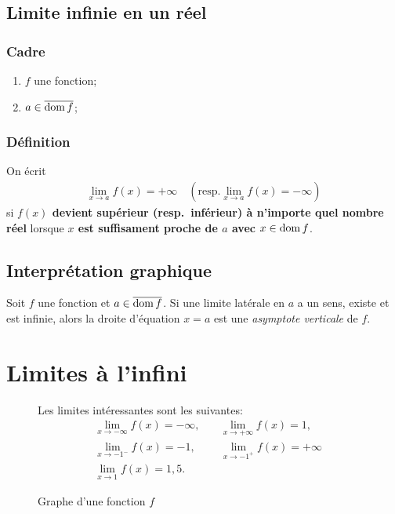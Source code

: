 \documentclass[main.tex]{subfiles}
\begin{document}
\subsection{Limite infinie en un réel}

\begin{definition}

    \subsubsection*{Cadre}
    \begin{enumerate}
        \item $f$ une fonction;
        \item $a \in \overline{\operatorname{dom} f}$;
    \end{enumerate}

    \subsubsection*{Définition}
    On écrit
    \begin{align}
        \lim_{x \to a} f(x) = +\infty \quad
        \left(\text{resp.} \lim_{x \to a} f(x) = -\infty\right)
    \end{align}
    si \textbf{$f(x)$ devient supérieur (resp.\ inférieur) à n'importe quel nombre réel}
    lorsque \textbf{$x$ est suffisament proche de $a$ avec $x \in \operatorname{dom} f$}.
\end{definition}

\subsection{Interprétation graphique}

\begin{definition}

    Soit $f$ une fonction et $a \in \overline{\operatorname{dom} f}$.
    Si une limite latérale en $a$ a un sens, existe et est infinie,
    alors la droite d'équation $x = a$ est
    une \emph{asymptote verticale} de $f$.
\end{definition}

\section{Limites à l'infini}

\begin{figure}
    \centering
    \begin{plot}{0.25}{-10}{-10}{10}{10}
    \end{plot}
    \caption{Graphe d'une fonction $f$}
    Les limites intéressantes sont les suivantes:
    \begin{align}
        &\lim_{x \to -\infty} f(x) = -\infty, \quad
        &\lim_{x \to +\infty} f(x) = 1,\\
        &\lim_{x \to -1^-} f(x) = -1, \quad
        &\lim_{x \to -1^+} f(x) = +\infty\\
        &\lim_{x \to 1} f(x) = 1,5.
    \end{align}
\end{figure}
\end{document}
